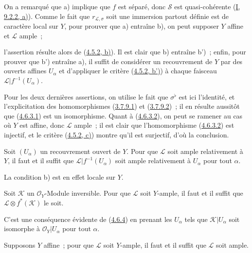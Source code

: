 On a remarqué que a) implique que $f$ est séparé, donc $\mathcal{S}$ est
quasi-cohérente (\hyperref[I.9.2.2-fr]{I, 9.2.2, a)}). Comme le fait que
$r_{\mathcal{L},\sigma}$ soit une immersion partout définie est de
caractère local sur $Y$, pour prouver que a) entraîne b), on peut supposer
$Y$ affine et $\mathcal{L}$ ample~;


l'assertion résulte alors de (\hyperref[II.4.5.2-fr]{4.5.2, b)}). Il est
clair que b) entraîne b')~; enfin, pour prouver que b') entraîne a), il
suffit de considérer un recouvrement de $Y$ par des ouverts affines
$U_\alpha$ et d'appliquer le critère
(\hyperref[II.4.5.2-fr]{4.5.2, b')}) à chaque faisceau
$\mathcal{L}|f^{-1}(U_\alpha)$.

Pour les deux dernières assertions, on utilise le fait que
$\sigma^\flat$ est ici l'identité, et l'explicitation des homomorphismes
(\hyperref[II.3.7.9.1-fr]{3.7.9.1}) et
(\hyperref[II.3.7.9.2-fr]{3.7.9.2})~; il en résulte aussitôt que
(\hyperref[II.4.6.3.1-fr]{4.6.3.1}) est un isomorphisme. Quant à
(\hyperref[II.4.6.3.2-fr]{4.6.3.2}), on peut se ramener au cas où $Y$ est
affine, donc $\mathcal{L}$ ample~; il est clair que l'homomorphisme
(\hyperref[II.4.6.3.2-fr]{4.6.3.2}) est injectif, et le critère
(\hyperref[II.4.5.2-fr]{4.5.2, c)}) montre qu'il est surjectif, d'où la
conclusion.

\begin{corollary}[4.6.4]
\label{II.4.6.4-fr}
Soit $(U_\alpha)$ un recouvrement ouvert de $Y$. Pour que $\mathcal{L}$
soit ample relativement à $Y$, il faut et il suffit que
$\mathcal{L}|f^{-1}(U_\alpha)$ soit ample relativement à $U_\alpha$ pour
tout $\alpha$.
\end{corollary}

La condition b) est en effet locale sur $Y$.

\begin{corollary}[4.6.5]
\label{II.4.6.5-fr}
Soit $\mathcal{K}$ un $\mathcal{O}_Y$-Module inversible. Pour que
$\mathcal{L}$ soit $Y$-ample, il faut et il suffit que
$\mathcal{L}\otimes f^*(\mathcal{K})$ le soit.
\end{corollary}

C'est une conséquence évidente de (\hyperref[II.4.6.4-fr]{4.6.4}) en
prenant les $U_\alpha$ tels que $\mathcal{K}|U_\alpha$ soit isomorphe à
$\mathcal{O}_Y|U_\alpha$ pour tout $\alpha$.

\begin{corollary}[4.6.6]
\label{II.4.6.6-fr}
Supposons $Y$ affine~; pour que $\mathcal{L}$ soit $Y$-ample, il faut et il
suffit que $\mathcal{L}$ soit ample.
\end{corollary}

